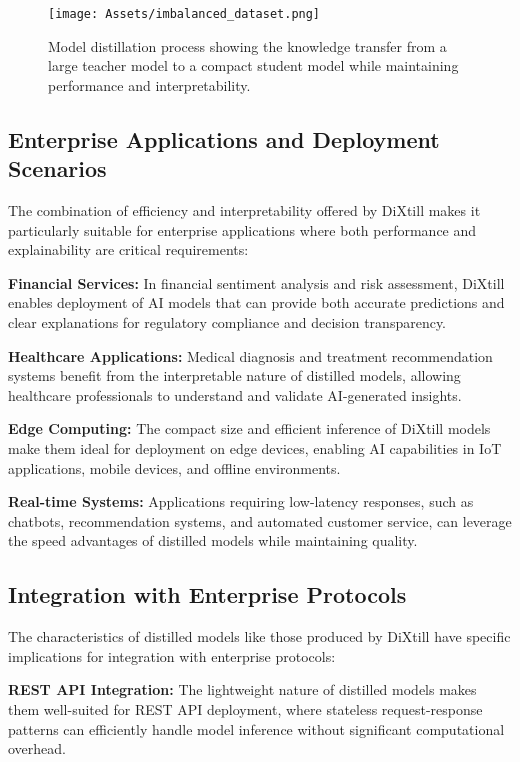 \begin{figure}[H]
    \centering
    \texttt{[image: Assets/imbalanced\_dataset.png]}
    \caption{Model distillation process showing the knowledge transfer from a large teacher model to a compact student model while maintaining performance and interpretability.\cite{Khalfe2024}}
    \label{fig:model_distillation}
\end{figure}

\subsection{Enterprise Applications and Deployment Scenarios}

The combination of efficiency and interpretability offered by DiXtill makes it particularly suitable for enterprise applications where both performance and explainability are critical requirements:

\textbf{Financial Services:} In financial sentiment analysis and risk assessment, DiXtill enables deployment of AI models that can provide both accurate predictions and clear explanations for regulatory compliance and decision transparency.

\textbf{Healthcare Applications:} Medical diagnosis and treatment recommendation systems benefit from the interpretable nature of distilled models, allowing healthcare professionals to understand and validate AI-generated insights.

\textbf{Edge Computing:} The compact size and efficient inference of DiXtill models make them ideal for deployment on edge devices, enabling AI capabilities in IoT applications, mobile devices, and offline environments.

\textbf{Real-time Systems:} Applications requiring low-latency responses, such as chatbots, recommendation systems, and automated customer service, can leverage the speed advantages of distilled models while maintaining quality.

\subsection{Integration with Enterprise Protocols}

The characteristics of distilled models like those produced by DiXtill have specific implications for integration with enterprise protocols:

\textbf{REST API Integration:} The lightweight nature of distilled models makes them well-suited for REST API deployment, where stateless request-response patterns can efficiently handle model inference without significant computational overhead.

